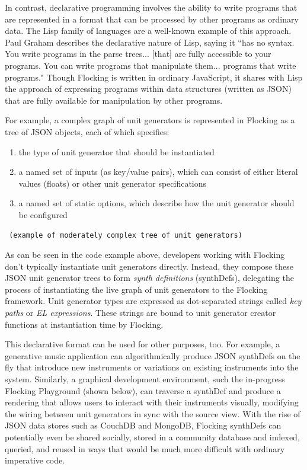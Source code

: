 \documentclass{article}
\begin{document}
In contrast, declarative programming involves the ability to write programs that are represented in a format that can be processed by other programs as ordinary data. The Lisp family of languages are a well-known example of this approach. Paul Graham describes the declarative nature of Lisp, saying it ``has no syntax. You write programs in the parse trees... [that] are fully accessible to your programs. You can write programs that manipulate them... programs that write programs." Though Flocking is written in ordinary JavaScript, it shares with Lisp the approach of expressing programs within data structures (written as JSON) that are fully available for manipulation by other programs.

For example, a complex graph of unit generators is represented in Flocking as a tree of JSON objects, each of which specifies:

\begin{enumerate}
\item the type of unit generator that should be instantiated
\item a named set of inputs (as key/value pairs), which can consist of either literal values (floats) or other unit generator specifications
\item a named set of static options, which describe how the unit generator should be configured
\end{enumerate}

\begin{verbatim}
 (example of moderately complex tree of unit generators)
\end{verbatim}

As can be seen in the code example above, developers working with Flocking don't typically instantiate unit generators directly. Instead, they compose these JSON unit generator trees to form {\it synth definitions} (synthDefs), delegating the process of instantiating the live graph of unit generators to the Flocking framework. Unit generator types are expressed as dot-separated strings called {\it key paths} or {\it EL expressions}. These strings are bound to unit generator creator functions at instantiation time by Flocking.

This declarative format can be used for other purposes, too. For example, a generative music application can algorithmically produce JSON synthDefs on the fly that introduce new instruments or variations on existing instruments into the system. Similarly, a graphical development environment, such the in-progress Flocking Playground (shown below), can traverse a synthDef and produce a rendering that allows users to interact with their instruments visually, modifying the wiring between unit generators in sync with the source view. With the rise of JSON data stores such as CouchDB and MongoDB, Flocking synthDefs can potentially even be shared socially, stored in a community database and indexed, queried, and reused in ways that would be much more difficult with ordinary imperative code.
\end{document}

